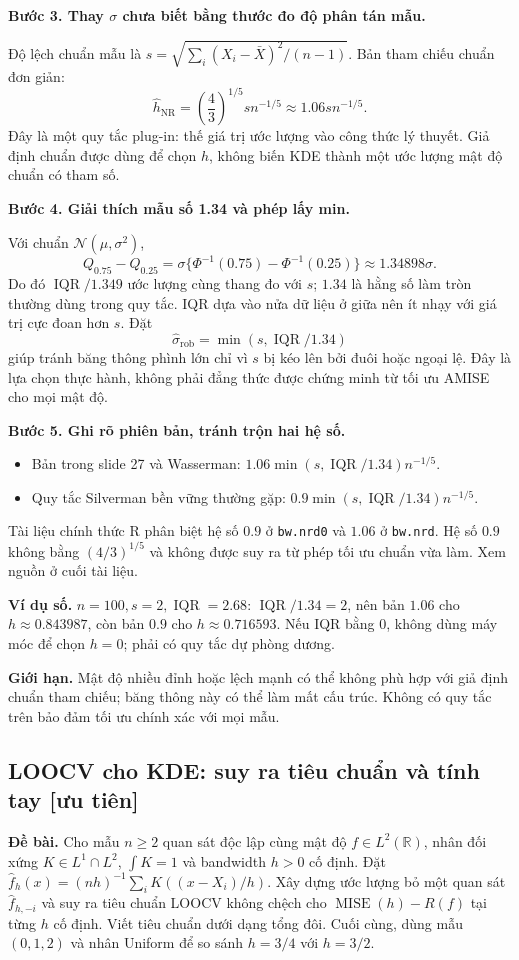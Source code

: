 \documentclass[11pt,a4paper]{article}
\DeclareMathOperator{\MISE}{MISE}
\DeclareMathOperator{\IQR}{IQR}
\newcommand{\R}{\mathbb R}
\newcommand{\buoc}[1]{\par\medskip\textbf{#1}\par}
\begin{document}
\buoc{Bước 3. Thay $\sigma$ chưa biết bằng thước đo độ phân tán mẫu.}
Độ lệch chuẩn mẫu là $s=\sqrt{\sum_i(X_i-\bar X)^2/(n-1)}$. Bản tham chiếu chuẩn đơn giản:
\[
\widehat h_{\mathrm{NR}}=\left(\frac43\right)^{1/5}s n^{-1/5}\approx1.06s n^{-1/5}.
\]
Đây là một quy tắc plug-in: thế giá trị ước lượng vào công thức lý thuyết. Giả định chuẩn được dùng để chọn $h$, không biến KDE thành một ước lượng mật độ chuẩn có tham số.

\buoc{Bước 4. Giải thích mẫu số 1.34 và phép lấy min.}
Với chuẩn $\mathcal N(\mu,\sigma^2)$,
\[
Q_{0.75}-Q_{0.25}=\sigma\{\Phi^{-1}(0.75)-\Phi^{-1}(0.25)\}
\approx1.34898\sigma.
\]
Do đó $\IQR/1.349$ ước lượng cùng thang đo với $s$; $1.34$ là hằng số làm tròn thường dùng trong quy tắc. IQR dựa vào nửa dữ liệu ở giữa nên ít nhạy với giá trị cực đoan hơn $s$. Đặt
\[
\widehat\sigma_{\mathrm{rob}}=\min(s,\IQR/1.34)
\]
giúp tránh băng thông phình lớn chỉ vì $s$ bị kéo lên bởi đuôi hoặc ngoại lệ. Đây là lựa chọn thực hành, không phải đẳng thức được chứng minh từ tối ưu AMISE cho mọi mật độ.

\buoc{Bước 5. Ghi rõ phiên bản, tránh trộn hai hệ số.}
\begin{itemize}
\item Bản trong slide 27 và Wasserman: $1.06\min(s,\IQR/1.34)n^{-1/5}$.
\item Quy tắc Silverman bền vững thường gặp: $0.9\min(s,\IQR/1.34)n^{-1/5}$.
\end{itemize}
Tài liệu chính thức R phân biệt hệ số $0.9$ ở \texttt{bw.nrd0} và $1.06$ ở \texttt{bw.nrd}. Hệ số $0.9$ không bằng $(4/3)^{1/5}$ và không được suy ra từ phép tối ưu chuẩn vừa làm. Xem nguồn ở cuối tài liệu.

\textbf{Ví dụ số.} $n=100,s=2,\IQR=2.68$: $\IQR/1.34=2$, nên bản $1.06$ cho $h\approx0.843987$, còn bản $0.9$ cho $h\approx0.716593$. Nếu IQR bằng 0, không dùng máy móc để chọn $h=0$; phải có quy tắc dự phòng dương.

\textbf{Giới hạn.} Mật độ nhiều đỉnh hoặc lệch mạnh có thể không phù hợp với giả định chuẩn tham chiếu; băng thông này có thể làm mất cấu trúc. Không có quy tắc trên bảo đảm tối ưu chính xác với mọi mẫu.

\subsection{LOOCV cho KDE: suy ra tiêu chuẩn và tính tay [ưu tiên]}\label{sec:cv}
\textbf{Đề bài.} Cho mẫu $n\geq2$ quan sát độc lập cùng mật độ $f\in L^2(\R)$,
nhân đối xứng $K\in L^1\cap L^2$, $\int K=1$ và bandwidth $h>0$ cố định.
Đặt $\widehat f_h(x)=(nh)^{-1}\sum_iK((x-X_i)/h)$.
Xây dựng ước lượng bỏ một quan sát $\widehat f_{h,-i}$ và suy ra tiêu chuẩn LOOCV
không chệch cho $\MISE(h)-R(f)$ tại từng $h$ cố định. Viết tiêu chuẩn dưới dạng tổng đôi.
Cuối cùng, dùng mẫu $(0,1,2)$ và nhân Uniform để so sánh $h=3/4$ với $h=3/2$.
\end{document}
